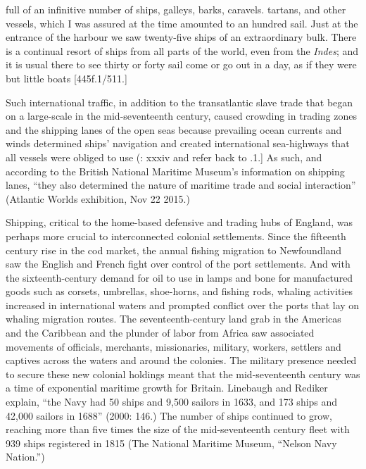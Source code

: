 full of an infinitive number of ships, galleys, barks, caravels. tartans, and other vessels, which I was assured at the time amounted to an hundred sail. Just at the entrance of the harbour we saw twenty-five ships of an extraordinary bulk. There is a continual resort of ships from all parts of the world, even from the \textit{Indes}; and it is usual there to see thirty or forty sail come or go out in a day, as if they were but little boats [445f.1/511.] 

Such international traffic, in addition to the transatlantic slave trade that began on a large-scale in the mid-seventeenth century, caused crowding in trading zones and the shipping lanes of the open seas because prevailing ocean currents and winds determined ships’ navigation and created international sea-highways that all vessels were obliged to use (\citealt{AdkinsAdkins2008}: xxxiv and refer back to .1.] As such, and according to the British National Maritime Museum’s information on shipping lanes, “they also determined the nature of maritime trade and social interaction” (Atlantic Worlds exhibition, Nov 22 2015.)  

Shipping, critical to the home-based defensive and trading hubs of England, was perhaps more crucial to interconnected colonial settlements. Since the fifteenth century rise in the cod market, the annual fishing migration to Newfoundland saw the English and French fight over control of the port settlements. And with the sixteenth-century demand for oil to use in lamps and bone for manufactured goods such as corsets, umbrellas, shoe-horns, and fishing rods, whaling activities increased in international waters and prompted conflict over the ports that lay on whaling migration routes. The seventeenth-century land grab in the Americas and the Caribbean and the plunder of labor from Africa saw associated movements of officials, merchants, missionaries, military, workers, settlers and captives across the waters and around the colonies. The military presence needed to secure these new colonial holdings meant that the mid-seventeenth century was a time of exponential maritime growth for Britain. Linebaugh and Rediker explain, “the Navy had 50 ships and 9,500 sailors in 1633, and 173 ships and 42,000 sailors in 1688” (2000: 146.)  The number of ships continued to grow, reaching more than five times the size of the mid-seventeenth century fleet with 939 ships registered in 1815 (The National Maritime Museum, “Nelson Navy Nation.”) 

